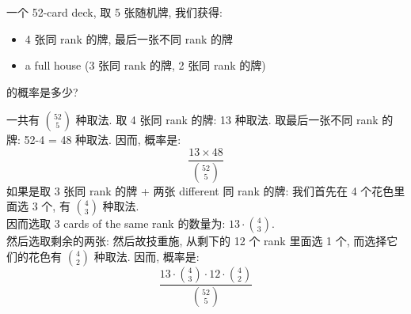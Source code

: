 \begin{example}
    一个 52-card deck, 取 5 张随机牌, 我们获得:
    \begin{itemize}
        \item 4 张同 rank 的牌, 最后一张不同 rank 的牌
        \item a full house (3 张同 rank 的牌, 2 张同 rank 的牌)
    \end{itemize}
    的概率是多少?
    \begin{solution}
        一共有 $\binom{52}{5}$ 种取法.
        取 4 张同 rank 的牌: 13 种取法.
        取最后一张不同 rank 的牌: 52-4 = 48 种取法.
        因而, 概率是: \[
        \frac{13 \times 48}{\binom{52}{5}} 
        \]
        如果是取 3 张同 rank 的牌 + 两张 different 同 rank 的牌: 我们首先在 4 个花色里面选 3 个, 有 $\binom{4}{3}$ 种取法. \\
        因而选取 3 cards of the same rank 的数量为: $13 \cdot \binom{4}{3}$.\\
        然后选取剩余的两张: 
        然后故技重施, 从剩下的 12 个 rank 里面选 1 个, 而选择它们的花色有 $\binom{4}{2}$ 种取法. 因而, 概率是: \[
        \frac{13 \cdot \binom{4}{3} \cdot 12 \cdot \binom{4}{2}}{\binom{52}{5}} 
        \]
    \end{solution}
\end{example}

